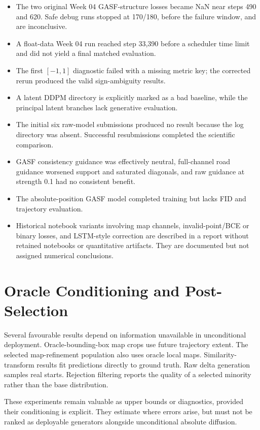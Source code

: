\documentclass[12pt,a4paper,oneside]{report}
\begin{document}
\begin{itemize}
  \item The two original Week 04 GASF-structure losses became NaN near steps 490 and 620. Safe debug runs stopped at 170/180, before the failure window, and are inconclusive.
  \item A float-data Week 04 run reached step 33,390 before a scheduler time limit and did not yield a final matched evaluation.
  \item The first $[-1,1]$ diagnostic failed with a missing metric key; the corrected rerun produced the valid sign-ambiguity results.
  \item A latent DDPM directory is explicitly marked as a bad baseline, while the principal latent branches lack generative evaluation.
  \item The initial six raw-model submissions produced no result because the log directory was absent. Successful resubmissions completed the scientific comparison.
  \item GASF consistency guidance was effectively neutral, full-channel road guidance worsened support and saturated diagonals, and raw guidance at strength 0.1 had no consistent benefit.
  \item The absolute-position GASF model completed training but lacks FID and trajectory evaluation.
  \item Historical notebook variants involving map channels, invalid-point/BCE or binary losses, and LSTM-style correction are described in a report without retained notebooks or quantitative artifacts. They are documented but not assigned numerical conclusions.
\end{itemize}

\section{Oracle Conditioning and Post-Selection}

Several favourable results depend on information unavailable in unconditional deployment. Oracle-bounding-box map crops use future trajectory extent. The selected map-refinement population also uses oracle local maps. Similarity-transform results fit predictions directly to ground truth. Raw delta generation samples real starts. Rejection filtering reports the quality of a selected minority rather than the base distribution.

These experiments remain valuable as upper bounds or diagnostics, provided their conditioning is explicit. They estimate where errors arise, but must not be ranked as deployable generators alongside unconditional absolute diffusion.
\end{document}
